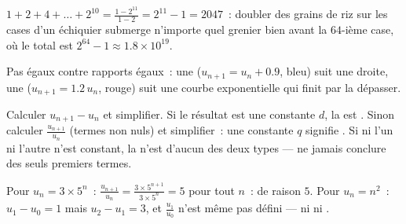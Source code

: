 \begin{example}\label{ex:g11:seq:chessboard}
$1 + 2 + 4 + \dots + 2^{10} = \frac{1 - 2^{11}}{1 - 2} = 2^{11} - 1 =
2047$~: doubler des grains de riz sur les cases d'un échiquier
submerge n'importe quel grenier bien avant la $64$-ième case, où le
total est $2^{64} - 1 \approx 1.8 \times 10^{19}$.
\end{example}

\begin{omfigure}

{\small Pas égaux contre rapports égaux~: une 
($u_{n+1} = u_n + 0.9$, bleu) suit une droite, une 
($u_{n+1} = 1.2\,u_n$, rouge) suit une courbe exponentielle qui finit
par la dépasser.}
\end{omfigure}

\begin{method}\label{met:g11:seq:recognize}
Calculer $u_{n+1} - u_n$ et simplifier. Si le résultat est une constante
$d$, la  est . Sinon calculer $\frac{u_{n+1}}{u_n}$
(termes non nuls) et simplifier~: une constante $q$ signifie
. Si ni l'un ni l'autre n'est constant, la  n'est d'aucun
des deux types --- ne jamais conclure des seuls premiers termes.
\end{method}

\begin{example}
Pour $u_n = 3 \times 5^n$~:
$\frac{u_{n+1}}{u_n} = \frac{3 \times 5^{n+1}}{3 \times 5^n} = 5$ pour
tout $n$~:  de raison $5$. Pour $u_n = n^2$~:
$u_1 - u_0 = 1$ mais $u_2 - u_1 = 3$, et $\frac{u_1}{u_0}$ n'est même
pas défini --- ni  ni .
\end{example}


